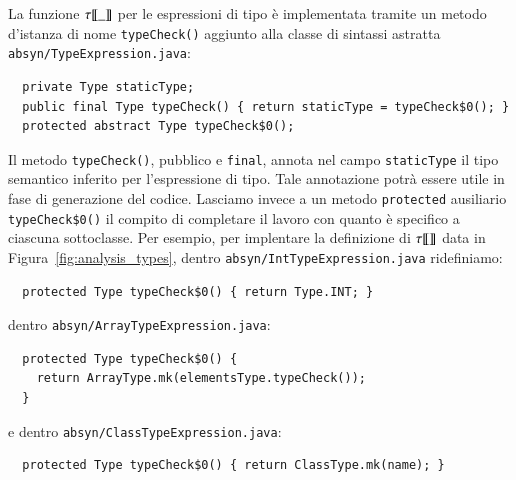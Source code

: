 La funzione ${\tau[\![{\_}]\!]}$ per le espressioni di tipo \`e implementata tramite
un metodo d'istanza di nome \texttt{typeCheck()} aggiunto alla
classe di sintassi astratta \texttt{absyn/TypeExpression.java}:
%
\begin{verbatim}
  private Type staticType;
  public final Type typeCheck() { return staticType = typeCheck$0(); }
  protected abstract Type typeCheck$0();
\end{verbatim}
%
Il metodo \texttt{typeCheck()}, pubblico e \texttt{final}, annota nel campo
\texttt{staticType} il tipo semantico inferito per l'espressione di tipo.
Tale annotazione potr\`a essere utile
in fase di generazione del codice. Lasciamo invece
a un metodo \texttt{protected} ausiliario \texttt{typeCheck\$0()} il
compito di completare il lavoro con quanto \`e specifico a ciascuna
sottoclasse. Per esempio, per implentare la definizione di ${\tau[\![{}]\!]}$ data
in Figura~\ref{fig:analysis_types},
dentro \texttt{absyn/IntTypeExpression.java} ridefiniamo:
%
\begin{verbatim}
  protected Type typeCheck$0() { return Type.INT; }
\end{verbatim}
%
dentro \texttt{absyn/ArrayTypeExpression.java}:
%
\begin{verbatim}
  protected Type typeCheck$0() {
    return ArrayType.mk(elementsType.typeCheck());
  }
\end{verbatim}
%
e dentro \texttt{absyn/ClassTypeExpression.java}:
%
\begin{verbatim}
  protected Type typeCheck$0() { return ClassType.mk(name); }
\end{verbatim}
